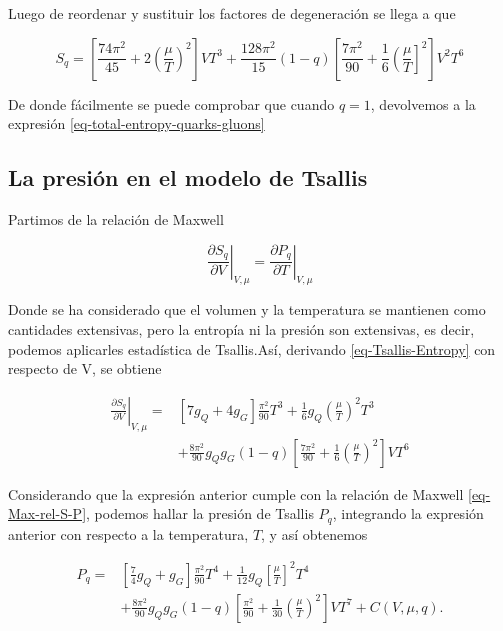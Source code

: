 Luego de reordenar y sustituir los factores de degeneración se llega a que

\begin{equation}\label{eq-Tsallis-Entropy}
{S}_{q} = \left[\frac{74{\pi}^{2}}{45} + 2 \left(\frac{\mu}{T} \right)^{2} \right]V{T}^{3} +  \frac{128{\pi}^{2}}{15} (1 - q) \left[\frac{7{\pi}^{2}}{90} + \frac{1}{6} \left(\frac{\mu}{T} \right]^{2} \right]{V}^{2}{T}^{6}
\end{equation}

De donde fácilmente se puede comprobar que cuando $q=1$, devolvemos a la expresión \eqref{eq-total-entropy-quarks-gluons} 

\subsection{La presión en el modelo de Tsallis}

Partimos de la relación de Maxwell

\begin{equation}\label{eq-Max-rel-S-P}
\left. \frac{\partial{S}_{q}}{\partial V} \right|_{V,\mu} = \left. \frac{\partial{P}_{q}}{\partial T} \right|_{V,\mu}
\end{equation}

Donde se ha considerado que el volumen y la temperatura se mantienen como cantidades extensivas, pero la entropía ni la presión son extensivas, es decir, podemos aplicarles estadística de Tsallis.Así, derivando \eqref{eq-Tsallis-Entropy} con respecto de V, se obtiene 

\begin{equation}
\begin{split}
\left. \frac{\partial{S}_{q}}{\partial V} \right|_{V,\mu}  =  & \left[ 7{g}_{Q} + 4 {g}_{G}\right] \frac{{\pi}^{2}}{90} {T}^{3} + \frac{1}{6} {g}_{Q} \left(\frac{\mu}{T} \right)^{2} {T}^{3}\\
& + \frac{8{\pi}^{2}}{90} {g}_{Q}{g}_{G} (1-q) \left[ \frac{7{\pi}^{2}}{90} + \frac{1}{6} \left(\frac{\mu}{T} \right)^{2} \right]V{T}^{6}
\end{split}
\end{equation}

Considerando que la expresión anterior cumple con la relación de Maxwell \eqref{eq-Max-rel-S-P}, podemos hallar la presión de Tsallis ${P}_{q}$, integrando la expresión anterior con respecto a la temperatura, $T$, y así obtenemos

\begin{equation}\label{eq-Tsallis-Pressure}
\begin{split}
{P}_{q} = & \left[\frac{7}{4} {g}_{Q} + {g}_{G} \right] \frac{{\pi}^{2}}{90} {T}^{4} + \frac{1}{12}{g}_{Q} \left[\frac{\mu}{T}\right]^{2}{T}^{4}\\
& + \frac{8{\pi}^{2}}{90} {g}_{Q}{g}_{G}(1-q) \left[\frac{{\pi}^{2}}{90} + \frac{1}{30} \left( \frac{\mu}{T}\right)^{2}\right]V{T}^{7} + C(V,\mu,q).
\end{split}
\end{equation}


